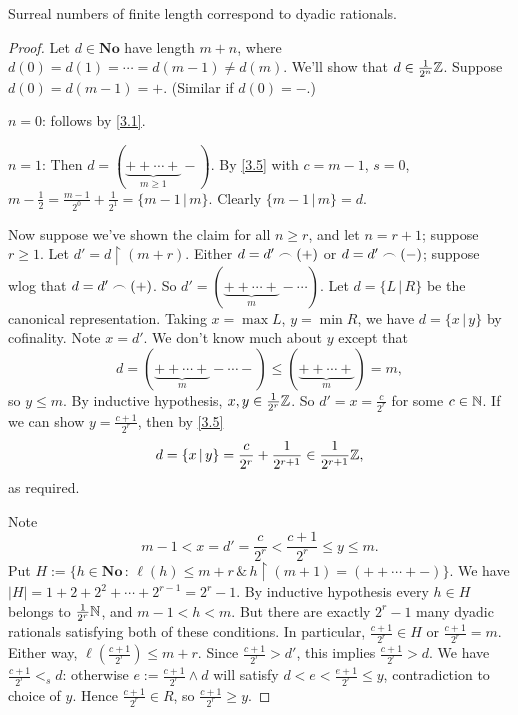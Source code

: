 \begin{proposition} %
Surreal numbers of finite length correspond to dyadic rationals.
\label{3.6}
\end{proposition}

\begin{proof} %
Let $d\in\mathbf{No}$ have length $m+n$, where $d(0) = d(1) = \cdots = d(m-1) \ne d(m)$. We'll show that 
$d\in\frac1{2^n}\mathbb{Z}$. Suppose $d(0) = d(m-1) = {+}$. (Similar if $d(0) = {-}$.) 
\begin{description}
\item $n=0$: follows by \eqref{3.1}.
\item $n=1$: Then $d = (\underbrace{++\cdots+}_{m\ge1}-)$. By \eqref{3.5} with $c = m-1$, $s=0$, $m-\frac12 = \frac{m-1}{2^0} + \frac{1}{2^1} = \{m-1 \,|\, m\}$. Clearly $\{m-1 \,|\, m\} = d$.
\end{description}
Now suppose we've shown the claim for all $n\ge r$, and let $n = r+1$; suppose $r\ge 1$. Let $d' = d\restriction (m+r)$.
Either $d = d'\frown (+)$ or $d=d'\frown (-)$; suppose wlog that $d = d'\frown (+)$. So $d' = (\underbrace{++\cdots+}_{m}-\cdots)$. Let $d = \{L \,|\, R\}$ be the canonical representation.
Taking $x=\max L$, $y = \min R$, we have $d = \{x \,|\, y\}$ by cofinality. Note $x = d'$. We don't know much about $y$ 
except that
\[ d = (\underbrace{++\cdots +}_{m}-\cdots -)\le (\underbrace{++\cdots+}_{m}) = m, \]
so $y\le m$. By inductive hypothesis, $x,y\in \frac1{2^r}\mathbb{Z}$. So $d' = x = \frac{c}{2^r}$ for some $c\in\mathbb{N}$. 
If we can show $y = \frac{c+1}{2^r}$, then by \eqref{3.5} 
\[ d = \{x \,|\, y \} = \frac{c}{2^r} + \frac{1}{2^{r+1}} \in \frac1{2^{r+1}}\mathbb{Z}, \]
as required.

Note 
\[m-1<x = d' = \frac{c}{2^r} < \frac{c+1}{2^r} \le y \le m. \]
Put $H := \{ h\in\mathbf{No} \,:\, \ell(h)\le m+ r \,\&\, h\restriction(m+1) = (++\cdots+-)\}$.
We have $|H| = 1+2+2^2+\cdots + 2^{r-1} = 2^r - 1$. By inductive hypothesis every $h\in H$ belongs to $\frac1{2^r}\mathbb{N}$,
and $m-1<h<m$. But there are exactly $2^r - 1$ many dyadic rationals satisfying both of these conditions. 
In particular, $\frac{c+1}{2^r}\in H$ or $\frac{c+1}{2^r}=m$. Either way, $\ell(\frac{c+1}{2^r})\le m+r$.
Since $\frac{c+1}{2^r} > d'$, this implies $\frac{c+1}{2^r} > d$. We have $\frac{c+1}{2^r} <_s d$:
otherwise $e := \frac{c+1}{2^r} \wedge d$ will satisfy $d < e < \frac{e+1}{2^r} \le y$, contradiction to choice of $y$.
Hence $\frac{c+1}{2^r}\in R$, so $\frac{c+1}{2^r}\ge y$.
\end{proof}

